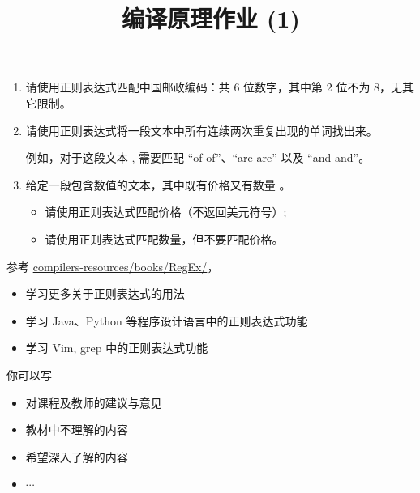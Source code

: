 \documentclass[a4paper, justified]{tufte-handout}
\title{编译原理作业 (1)}
\date{\zhtoday}
\begin{document}
\maketitle
\noplagiarism %
\begin{abstract}
\end{abstract}
\beginrequired
\begin{problem}[正则表达式]
  \begin{enumerate}[(1)]
    \item 请使用正则表达式匹配中国邮政编码：共 6 位数字，其中第 2 位不为 8，无其它限制。
    \item 请使用正则表达式将一段文本中所有连续两次重复出现的单词找出来。

      例如，对于这段文本 ,
      需要匹配 ``of of''、``are are'' 以及 ``and and''。
    \item 给定一段包含数值的文本，其中既有价格又有数量
      。
      \begin{itemize}
        \item 请使用正则表达式匹配价格（不返回美元符号）;
        \item 请使用正则表达式匹配数量，但不要匹配价格。
      \end{itemize}
  \end{enumerate}
\end{problem}

\begin{solution}
\end{solution}

\begin{problem}[正则表达式]
  参考 \href{https://github.com/courses-at-nju-by-hfwei/compilers-resources/tree/master/books/RegEx}{compilers-resources/books/RegEx/}，
  \begin{itemize}
    \item 学习更多关于正则表达式的用法
    \item 学习 Java、Python 等程序设计语言中的正则表达式功能
    \item 学习 Vim, grep 中的正则表达式功能
  \end{itemize}
\end{problem}

\begin{solution}
\end{solution}



\beginfb

你可以写
\begin{itemize}
  \item 对课程及教师的建议与意见
  \item 教材中不理解的内容
  \item 希望深入了解的内容
  \item $\cdots$
\end{itemize}
\end{document}
